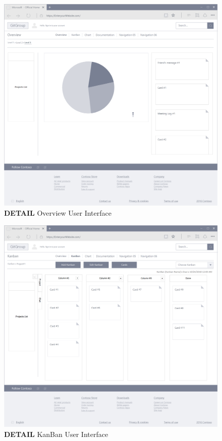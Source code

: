 \documentclass[12pt,a4paper]{report}
\begin{document}
\begin{figure}[h]
	\centering
	\includegraphics[width=\textwidth]{./pics/OverviewInterface.png}
	\caption{\textbf{DETAIL} Overview User Interface}
\end{figure}

\begin{figure}[h]
	\centering
	\includegraphics[width=\textwidth]{./pics/KanbanInterface.png}
	\caption{\textbf{DETAIL} KanBan User Interface}
\end{figure}
\end{document}
